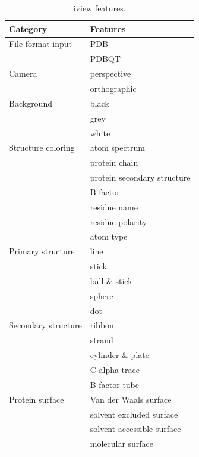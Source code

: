 \begin{table}
\caption{iview features.}
\label{iview:features}
\begin{tabular}{ll}
\hline
                 Category & Features\\
\hline
        File format input & PDB\\
                          & PDBQT\\
\hline
                   Camera & perspective\\
                          & orthographic\\
\hline
               Background & black\\
                          & grey\\
                          & white\\
\hline
       Structure coloring & atom spectrum\\
                          & protein chain\\
                          & protein secondary structure\\
                          & B factor\\
                          & residue name\\
                          & residue polarity\\
                          & atom type\\
\hline
        Primary structure & line\\
                          & stick\\
                          & ball \& stick\\
                          & sphere\\
                          & dot\\
\hline
      Secondary structure & ribbon\\
                          & strand\\
                          & cylinder \& plate\\
                          & C alpha trace\\
                          & B factor tube\\
\hline
          Protein surface & Van der Waals surface\\
                          & solvent excluded surface\\
                          & solvent accessible surface\\
                          & molecular surface\\

\end{tabular}
\end{table}
